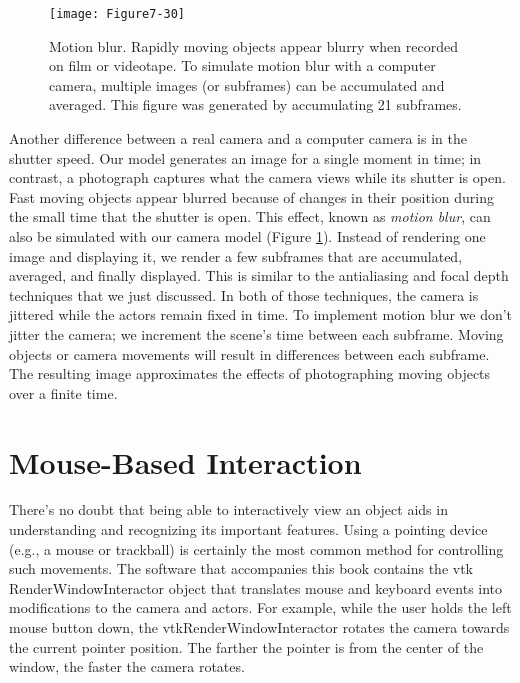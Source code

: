 \begin{figure}[!htb]
	\centering
	\texttt{[image: Figure7-30]}\\
	\caption{Motion blur. Rapidly moving objects appear blurry when recorded on film or videotape. To simulate motion blur with a computer camera, multiple images (or subframes) can be accumulated and averaged. This figure was generated by accumulating 21 subframes.}\label{fig:Figure7-30}
\end{figure}


Another difference between a real camera and a computer camera is in the shutter speed. Our model generates an image for a single moment in time; in contrast, a photograph captures what the camera views while its shutter is open. Fast moving objects appear blurred because of changes in their position during the small time that the shutter is open. This effect, known as \emph{motion blur}, can also be simulated with our camera model (Figure \ref{fig:Figure7-30}). Instead of rendering one image and displaying it, we render a few subframes that are accumulated, averaged, and finally displayed. This is similar to the antialiasing and focal depth techniques that we just discussed. In both of those techniques, the camera is jittered while the actors remain fixed in time. To implement motion blur we don't jitter the camera; we increment the scene's time between each subframe. Moving objects or camera movements will result in differences between each subframe. The resulting image approximates the effects of photographing moving objects over a finite time.

\section{Mouse-Based Interaction}

There's no doubt that being able to interactively view an object aids in understanding and recognizing its important features. Using a pointing device (e.g., a mouse or trackball) is certainly the most common method for controlling such movements. The software that accompanies this book contains the vtk RenderWindowInteractor object that translates mouse and keyboard events into modifications to the camera and actors. For example, while the user holds the left mouse button down, the vtkRenderWindowInteractor rotates the camera towards the current pointer position. The farther the pointer is from the center of the window, the faster the camera rotates.

